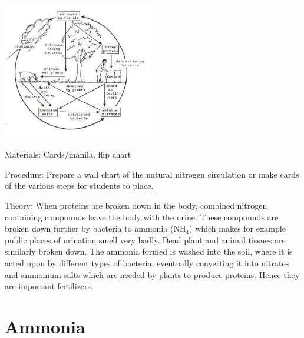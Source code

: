 \begin{multicols}{2}
\begin{center}
\includegraphics[width=0.49\textwidth]{./img/source/nitrogen-cycle.jpg}
\end{center}

\begin{description*}
\item[Materials:]{Cards/manila, flip chart}
\item[Procedure:]{Prepare a wall chart of the natural nitrogen
circulation or make cards of the various steps for students to place. }
\item[Theory:]{When proteins are broken down in
the body, combined nitrogen containing
compounds leave the body with the urine. These
compounds are broken down further by bacteria
to ammonia (NH$_4$) which makes for example
public places of urination smell very badly.
Dead plant and animal tissues are similarly
broken down. The ammonia formed is washed
into the soil, where it is acted upon by different
types of bacteria, eventually converting it into
nitrates and ammonium salts which are needed
by plants to produce proteins. Hence they are
important fertilizers.}
\end{description*}

\vfill
\columnbreak


\section*{Ammonia}



\end{multicols}
